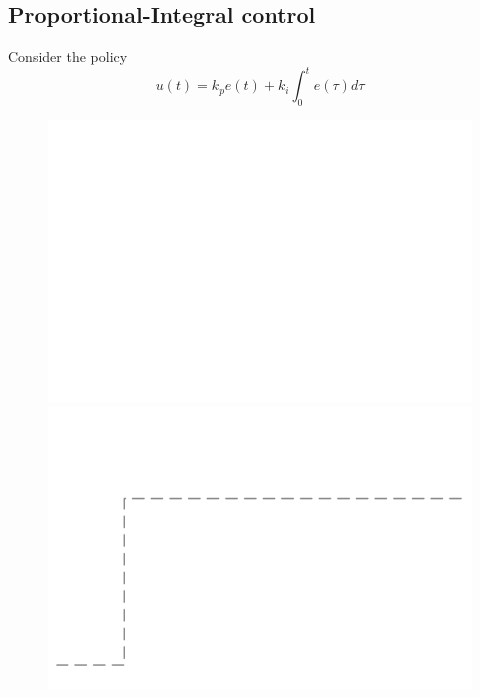 \documentclass[
  letterpaper,
  DIV=11,
  numbers=noendperiod,
  oneside]{scrartcl}
\begin{document}
\subsection{Proportional-Integral
control}\label{proportional-integral-control}

Consider the policy
\[u(t) = k_p e(t) + k_i \int_{0}^{t} e(\tau) d \tau\]

\begin{figure}

\begin{minipage}{0.50\linewidth}
\includegraphics{figs/anim_PI_u.gif}\end{minipage}%
%
\begin{minipage}{0.50\linewidth}
\includegraphics{figs/anim_PI_y.gif}\end{minipage}%

\end{figure}%
\end{document}
